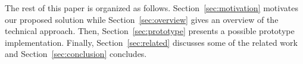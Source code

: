 


The rest of this paper is organized as follows.
Section~\ref{sec:motivation} motivates our proposed solution while
Section~\ref{sec:overview} gives an overview of the technical approach.
Then, Section~\ref{sec:prototype} presents a possible prototype
implementation. Finally, Section~\ref{sec:related} discusses some of the
related work and Section~\ref{sec:conclusion} concludes.



